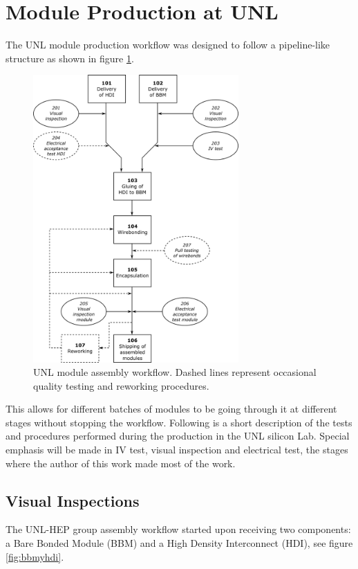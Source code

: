 
\section{Module Production at UNL}
The UNL module production workflow was designed to follow a pipeline-like structure as shown in figure \ref{fig:unlworkflow}. 

\begin{figure}[!h]
  \centering
  \includegraphics[width=0.7\textwidth]{../images/ch7/unl_workflow}
  \caption[UNL module assembly workflow.]{UNL module assembly workflow. Dashed lines represent occasional quality testing and reworking procedures\cite{ph1_sop}.}\label{fig:unlworkflow}
\end{figure}

This allows for different batches of modules to be going through it at different stages without stopping the workflow. Following is a short description of the tests and procedures performed during the production in the UNL silicon Lab. Special emphasis will be made in IV test, visual inspection and electrical test, the stages where the author of this work made most of the work{}. 

\subsection{Visual Inspections}
The UNL-HEP group assembly workflow started upon receiving two components: a Bare Bonded Module (BBM) and a High Density Interconnect (HDI), see figure \ref{fig:bbmyhdi}.

